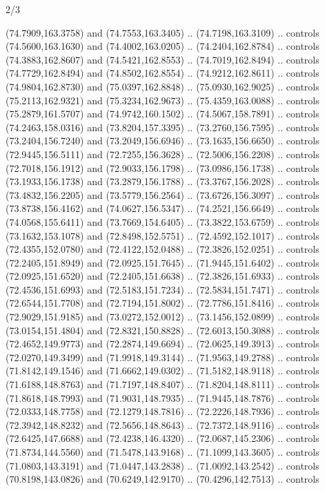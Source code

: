 \begin{flagdescription}{2/3}
\begin{scope}[shift={(0.5\flaglength,0.5)},scale=\flagwidth/320]
\begin{scope}[y=0.8pt, x=0.8pt, yscale=-1,shift={(-118.3,-146)}]
  (74.7909,163.3758) and (74.7553,163.3405) .. (74.7198,163.3109) .. controls
  (74.5600,163.1630) and (74.4002,163.0205) .. (74.2404,162.8784) .. controls
  (74.3883,162.8607) and (74.5421,162.8553) .. (74.7019,162.8494) .. controls
  (74.7729,162.8494) and (74.8502,162.8554) .. (74.9212,162.8611) .. controls
  (74.9804,162.8730) and (75.0397,162.8848) .. (75.0930,162.9025) .. controls
  (75.2113,162.9321) and (75.3234,162.9673) .. (75.4359,163.0088) .. controls
  (75.2879,161.5707) and (74.9742,160.1502) .. (74.5067,158.7891) .. controls
  (74.2463,158.0316) and (73.8204,157.3395) .. (73.2760,156.7595) .. controls
  (73.2404,156.7240) and (73.2049,156.6946) .. (73.1635,156.6650) .. controls
  (72.9445,156.5111) and (72.7255,156.3628) .. (72.5006,156.2208) .. controls
  (72.7018,156.1912) and (72.9033,156.1798) .. (73.0986,156.1738) .. controls
  (73.1933,156.1738) and (73.2879,156.1788) .. (73.3767,156.2028) .. controls
  (73.4832,156.2205) and (73.5779,156.2564) .. (73.6726,156.3097) .. controls
  (73.8738,156.4162) and (74.0627,156.5347) .. (74.2521,156.6649) .. controls
  (74.0568,155.6411) and (73.7669,154.6405) .. (73.3822,153.6759) .. controls
  (73.1632,153.1078) and (72.8498,152.5751) .. (72.4592,152.1017) .. controls
  (72.4355,152.0780) and (72.4122,152.0488) .. (72.3826,152.0251) .. controls
  (72.2405,151.8949) and (72.0925,151.7645) .. (71.9445,151.6402) .. controls
  (72.0925,151.6520) and (72.2405,151.6638) .. (72.3826,151.6933) .. controls
  (72.4536,151.6993) and (72.5183,151.7234) .. (72.5834,151.7471) .. controls
  (72.6544,151.7708) and (72.7194,151.8002) .. (72.7786,151.8416) .. controls
  (72.9029,151.9185) and (73.0272,152.0012) .. (73.1456,152.0899) .. controls
  (73.0154,151.4804) and (72.8321,150.8828) .. (72.6013,150.3088) .. controls
  (72.4652,149.9773) and (72.2874,149.6694) .. (72.0625,149.3913) .. controls
  (72.0270,149.3499) and (71.9918,149.3144) .. (71.9563,149.2788) .. controls
  (71.8142,149.1546) and (71.6662,149.0302) .. (71.5182,148.9118) .. controls
  (71.6188,148.8763) and (71.7197,148.8407) .. (71.8204,148.8111) .. controls
  (71.8618,148.7993) and (71.9031,148.7935) .. (71.9445,148.7876) .. controls
  (72.0333,148.7758) and (72.1279,148.7816) .. (72.2226,148.7936) .. controls
  (72.3942,148.8232) and (72.5656,148.8643) .. (72.7372,148.9116) .. controls
  (72.6425,147.6688) and (72.4238,146.4320) .. (72.0687,145.2306) .. controls
  (71.8734,144.5560) and (71.5478,143.9168) .. (71.1099,143.3605) .. controls
  (71.0803,143.3191) and (71.0447,143.2838) .. (71.0092,143.2542) .. controls
  (70.8198,143.0826) and (70.6249,142.9170) .. (70.4296,142.7513) .. controls

\end{scope}
\end{scope}
\end{flagdescription}
